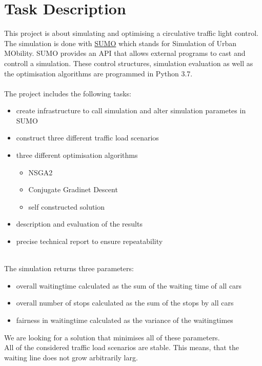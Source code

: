 \documentclass[./\jobname.tex]{subfiles}
\begin{document}
\chapter{Task Description}

This project is about simulating and optimising a circulative traffic light control. The simulation is done with  \href{https://www.dlr.de/ts/en/desktopdefault.aspx/tabid-9883/16931_read-41000/}{SUMO} which stands for Simulation of Urban MObility. SUMO provides an API that allows external programs to cast and controll a simulation. These control structures, simulation evaluation as well as the optimisation algorithms are programmed in Python 3.7. \\~\\
The project includes the following tasks: 
\begin{itemize}
	\item create infrastructure to call simulation and alter simulation parametes in SUMO
	\item construct three different traffic load scenarios
	\item three different optimisation algorithms
	\begin{itemize}
		\item NSGA2
		\item Conjugate Gradinet Descent
		\item self constructed solution
	\end{itemize}
	\item description and evaluation of the results
	\item precise technical report to ensure repeatability \\~\\
\end{itemize}

The simulation returns three parameters: 
\begin{itemize}
	\item overall waitingtime calculated as the sum of the waiting time of all cars
	\item overall number of stops calculated as the sum of the stops by all cars
	\item fairness in waitingtime calculated as the variance of the waitingtimes \\
\end{itemize}
We are looking for a solution that minimises all of these parameters. \\
All of the considered traffic load scenarios are stable. This means, that the waiting line does not grow arbitrarily larg. 
\end{document}
